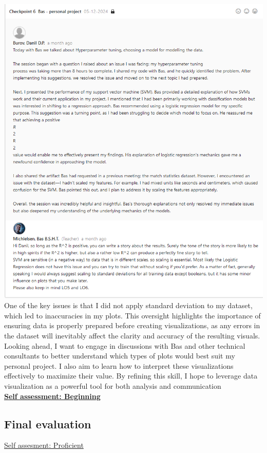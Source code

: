 \documentclass{article}
\begin{document}
\includegraphics[width=\textwidth,keepaspectratio]{images/Feedback_Bas_2.png}\\

One of the key issues is that I did not apply standard deviation to my dataset, which led to inaccuracies in my plots. This oversight highlights the importance of ensuring data is properly prepared before creating visualizations, as any errors in the dataset will inevitably affect the clarity and accuracy of the resulting visuals.\\

Looking ahead, I want to engage in discussions with Bas and other technical consultants to better understand which types of plots would best suit my personal project. I also aim to learn how to interpret these visualizations effectively to maximize their value. By refining this skill, I hope to leverage data visualization as a powerful tool for both analysis and communication\\
  \underline{\textbf{Self assessment: Beginning}}
\subsection{Final evaluation}
\underline{Self assesment: Proficient}
\end{document}
